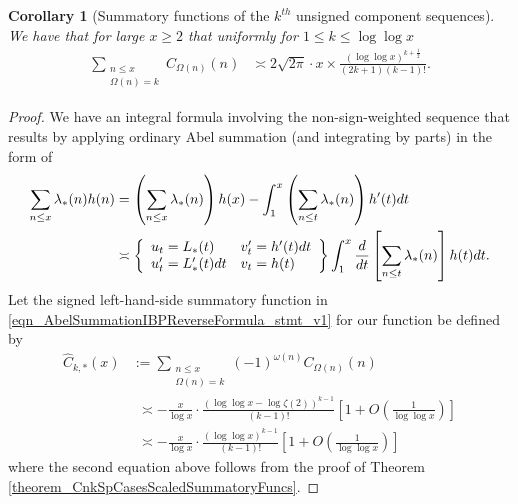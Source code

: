\documentclass[11pt,reqno,a4letter]{article}
\numberwithin{figure}{section}
\numberwithin{table}{section}
\theoremstyle{plain}
\newtheorem{cor}[theorem]{Corollary}
\numberwithin{theorem}{section}
\theoremstyle{definition}
\begin{document}
\begin{cor}[Summatory functions of the $k^{th}$ unsigned component sequences] 
\label{cor_SummatoryFuncsOfUnsignedSeqs_v2} 
We have that for large $x \geq 2$ that uniformly for $1 \leq k \leq \log\log x$ 
\begin{align*} 
\sum_{\substack{n \leq x \\ \Omega(n) = k}} C_{\Omega(n)}(n) & \asymp 
     2\sqrt{2\pi} \cdot x \times 
     \frac{(\log\log x)^{k+\frac{1}{2}}}{(2k+1)(k-1)!}. 
\end{align*} 
\end{cor} 
\begin{proof} 
We have an integral formula involving the non-sign-weighted 
sequence that results by 
applying ordinary Abel summation (and integrating by parts) in the form of 
\begin{align} 
\label{eqn_AbelSummationIBPReverseFormula_stmt_v1} 
\sum_{n \leq x} \lambda_{\ast}(n) h(n) & = \left(\sum_{n \leq x} \lambda_{\ast}(n)\right) h(x) - 
     \int_{1}^{x} \left(\sum_{n \leq t} \lambda_{\ast}(n)\right) h^{\prime}(t) dt \\ 
\notag 
     & \asymp \left\{\begin{array}{ll} 
     u_t = L_{\ast}(t) & v_t^{\prime} = h^{\prime}(t) dt \\ 
     u_t^{\prime} = L_{\ast}^{\prime}(t) dt & v_t = h(t) 
     \end{array} 
     \right\} 
     \int_1^{x} \frac{d}{dt}\left[\sum_{n \leq t} \lambda_{\ast}(n)\right] h(t) dt. 
\end{align} 
Let the signed left-hand-side summatory function in 
\eqref{eqn_AbelSummationIBPReverseFormula_stmt_v1} for our function be defined by 
\begin{align*} 
\widehat{C}_{k,\ast}(x) & := \sum_{\substack{n \leq x \\ \Omega(n)=k}} 
     (-1)^{\omega(n)} C_{\Omega(n)}(n) \\ 
     & \phantom{:} \asymp  
     -\frac{x}{\log x} \cdot \frac{(\log\log x - \log\zeta(2))^{k-1}}{(k-1)!} \left[ 
     1 + O\left(\frac{1}{\log\log x}\right)\right] \\ 
     & \phantom{:} \asymp 
     -\frac{x}{\log x} \cdot \frac{(\log\log x)^{k-1}}{(k-1)!} \left[ 
     1 + O\left(\frac{1}{\log\log x}\right)\right]
\end{align*} 
where the second equation above follows from the proof of 
Theorem \ref{theorem_CnkSpCasesScaledSummatoryFuncs}. 


\end{proof}
\end{document}
